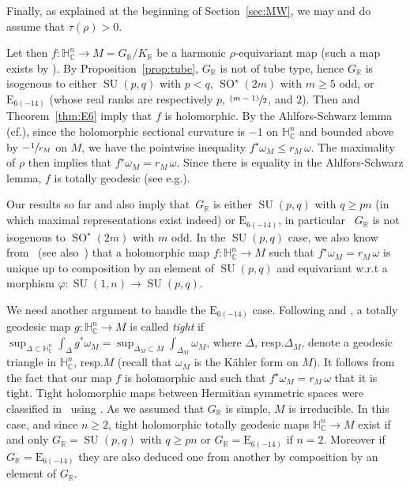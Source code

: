 \documentclass[10pt]{amsart}
\newcommand{\psfrac}[2]{\sfrac{(#1)}{#2}}
\newcommand{\citestar}[3]{\cite[#3]{#1}}
\theoremstyle{plain}
\theoremstyle{definition}
\DeclareMathOperator{\SO}{SO}
\DeclareMathOperator{\SU}{SU}
\newcommand{\bR}{\mathbb{R}}
\newcommand{\HC}{{\mathbb{H}^n_\mathbb{C}}}
\newcommand{\rkm}{{r_M}}
\providecommand{\eg}{e.g.}\providecommand{\ie}{i.e.}\providecommand{\etc}{etc.}\providecommand{\resp}{resp.}\providecommand{\cf}{cf.}
\begin{document}
Finally, as explained at the beginning of Section~\ref{sec:MW}, we may and do assume that $\tau(\rho)>0$.

Let then $f: \HC \to M =G_\bR/K_\bR$ be a harmonic $\rho$-equivariant map
(such a map exists by \cite{CorletteFlatGBundles}).
By Proposition~\ref{prop:tube}, $G_\bR$ is not of tube type, hence $G_\bR$ is isogenous to
either $\SU(p,q)$ with $p<q$, $\SO^\star(2m)$ with $m\geq 5$ odd, or $\mathrm{E}_{6(-14)}$ (whose
real ranks are respectively $p$, $\psfrac{m-1}2$, and $2$). Then
\citestar{KM}*{Th.\,4.1 \& Prop.\,5.6} and Theorem~\ref{thm:E6} imply that $f$ is holomorphic.
By the Ahlfors-Schwarz lemma (\cf \cite{Royden}), since the holomorphic sectional
curvature is $-1$ on $\HC$ and bounded above by $-\sfrac 1\rkm$ on $M$, we have the pointwise
inequality $f^\star \omega_M\leq \rkm \,\omega$. The maximality of $\rho$ then implies that
$f^\star\omega_M=\rkm\,\omega$.
Since there is equality in the Ahlfors-Schwarz lemma, $f$ is totally geodesic (see \eg \cite{Royden}).

Our results so far and \citestar{KM}*{Prop.\,4.10 \& 5.7} also imply that~$G_\bR$ is
either $\SU(p,q)$ with $q\geq pn$ (in which maximal representations exist indeed) or $\mathrm{E}_{6(-14)}$,
in particular~ $G_\bR$ is not isogenous to $\SO^\star(2m)$ with $m$ odd. In the $\SU(p,q)$ case,
we also know from~\citestar{KMrank2}*{} (see also~\citestar{KM}*{Prop.\,4.10})
that a holomorphic map $f:\HC\to M$ such that $f^\star\omega_M=\rkm\,\omega$ is unique up to composition by
an element of $\SU(p,q)$ and equivariant w.r.t a morphism
$\varphi:\SU(1,n)\to\SU(p,q)$.

We need another argument to handle the $\mathrm{E}_{6(-14)}$ case.
Following \citestar{BIW}*{p.\,690} and \citestar{Hamlet}*{p.640}, a totally geodesic map $g:\HC \to M$
is called \emph{tight} if
$\sup_{\Delta \subset \HC} \int_\Delta g^* \omega_M= \sup_{\Delta_M \subset M} \int_{\Delta_M}
\omega_M$, where $\Delta$, \resp $\Delta_M$, denote a geodesic triangle in $\HC$, \resp $M$
(recall that $\omega_M$ is the Kähler form on $M$).
It follows from the fact that our map $f$ is holomorphic and such that $f^\star\omega_M=\rkm\,\omega$
that it is tight.
Tight holomorphic maps between Hermitian
symmetric spaces were classified in~\cite{Hamlet} using \cite{ihara}.
As we assumed that $G_\bR$ is simple, $M$ is irreducible. In this case, and since $n\geq 2$, tight
holomorphic totally geodesic maps $\HC\to M$ exist if and only
$G_\bR=\SU(p,q)$ with $q\geq pn$ or $G_\bR=\mathrm{E}_{6(-14)}$ if $n=2$.
Moreover if $G_\bR=\mathrm{E}_{6(-14)}$ they are also
deduced one from another by composition by an element of $G_\bR$.
\end{document}
